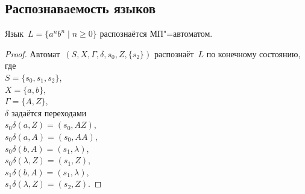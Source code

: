 \subsection{Распознаваемость языков}
\begin{statement}
Язык~$L = \{ a^n b^n \mid n \geqslant 0 \}$ распознаётся МП"=автоматом.
\end{statement}
\begin{proof}
Автомат~$(S, X, \Gamma, \delta, s_0, Z, \{ s_2 \})$ распознаёт~$L$ по конечному состоянию, где\\
$S = \{ s_0, s_1, s_2 \}$,\\
$X = \{ a, b \}$,\\
$\Gamma = \{ A, Z \}$,\\
$\delta$ задаётся переходами\\
$s_0 \delta(a, Z) = (s_0, AZ)$,\\
$s_0 \delta(a, A) = (s_0, AA)$,\\
$s_0 \delta(b, A) = (s_1, \lambda)$,\\
$s_0 \delta(\lambda, Z) = (s_1, Z)$,\\
$s_1 \delta(b, A) = (s_1, \lambda)$,\\
$s_1 \delta(\lambda, Z) = (s_2, Z)$.
\end{proof}